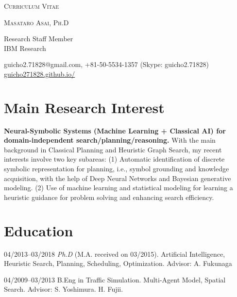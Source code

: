 \documentclass[letterpaper,11pt]{article}
\begin{document}
\pagestyle{empty}

\begin{center}
{\huge\textsc{Curriculum Vitae}}
\vspace{0.7\baselineskip}

{\Large\textsc{Masataro Asai, Ph.D}}
\vspace{0.5\baselineskip}

\small
{
Research Staff Member\\
IBM Research
}



 guicho2.71828@gmail.com, +81-50-5534-1357 (Skype: guicho2.71828) \url{guicho271828.github.io/}
\end{center}

\section{Main Research Interest}

\textbf{Neural-Symbolic Systems (Machine Learning + Classical AI) for domain-independent search/planning/reasoning.}
With the main background in Classical Planning and
Heuristic Graph Search, my recent interests involve two key subareas:
(1) Automatic identification of discrete symbolic representation for planning, i.e.,
symbol grounding and knowledge acquisition, with the help of Deep Neural Networks and Bayesian generative modeling.
(2) Use of machine learning and statistical modeling for learning a heuristic guidance for problem solving and enhancing search efficiency.


\section{Education}

\begin{CV}
 \item[04/2013--03/2018] \textit{Ph.D} (M.A. received on 03/2015).
 Artificial Intelligence, Heuristic Search, Planning, Scheduling, Optimization.
 {\small %
 Advisor: A. Fukunaga}

 \item[04/2009--03/2013] B.Eng in Traffic Simulation.
 Multi-Agent Model, Spatial Search.
 {\small %
 Advisor: S. Yoshimura. H. Fujii.}
\end{CV}
\end{document}
